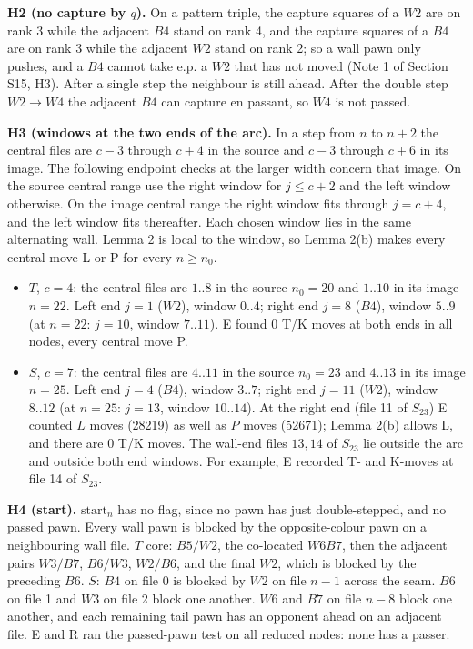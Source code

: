 \textbf{H2 (no capture by $q$).} On a pattern triple, the capture squares of a $W2$ are on rank 3 while the adjacent $B4$ stand on rank 4, and the capture squares of a $B4$ are on rank 3 while the adjacent $W2$ stand on rank 2; so a wall pawn only pushes, and a $B4$ cannot take e.p. a $W2$ that has not moved (Note 1 of Section S15, H3). After a single step the neighbour is still ahead. After the double step $W2\to W4$ the adjacent $B4$ can capture en passant, so $W4$ is not passed.

\textbf{H3 (windows at the two ends of the arc).} In a step from $n$ to $n+2$ the central files are $c-3$ through $c+4$ in the source and $c-3$ through $c+6$ in its image. The following endpoint checks at the larger width concern that image. On the source central range use the right window for $j\le c+2$ and the left window otherwise. On the image central range the right window fits through $j=c+4$, and the left window fits thereafter. Each chosen window lies in the same alternating wall. Lemma 2 is local to the window, so Lemma 2(b) makes every central move L or P for every $n\ge n_0$.

\begin{itemize}
\item $T$, $c=4$: the central files are $1..8$ in the source $n_0=20$ and $1..10$ in its image $n=22$. Left end $j=1$ ($W2$), window $0..4$; right end $j=8$ ($B4$), window $5..9$ (at $n=22$: $j=10$, window $7..11$). E found 0 T/K moves at both ends in all nodes, every central move P.
\item $S$, $c=7$: the central files are $4..11$ in the source $n_0=23$ and $4..13$ in its image $n=25$. Left end $j=4$ ($B4$), window $3..7$; right end $j=11$ ($W2$), window $8..12$ (at $n=25$: $j=13$, window $10..14$). At the right end (file 11 of $S_{23}$) E counted $L$ moves (28219) as well as $P$ moves (52671); Lemma 2(b) allows L, and there are 0 T/K moves. The wall-end files $13,14$ of $S_{23}$ lie outside the arc and outside both end windows. For example, E recorded T- and K-moves at file 14 of $S_{23}$.
\end{itemize}
\textbf{H4 (start).} $\mathrm{start}_n$ has no flag, since no pawn has just double-stepped, and no passed pawn. Every wall pawn is blocked by the opposite-colour pawn on a neighbouring wall file. $T$ core: $B5/W2$, the co-located $W6B7$, then the adjacent pairs $W3/B7$, $B6/W3$, $W2/B6$, and the final $W2$, which is blocked by the preceding $B6$. $S$: $B4$ on file 0 is blocked by $W2$ on file $n-1$ across the seam. $B6$ on file 1 and $W3$ on file 2 block one another. $W6$ and $B7$ on file $n-8$ block one another, and each remaining tail pawn has an opponent ahead on an adjacent file. E and R ran the passed-pawn test on all reduced nodes: none has a passer.

